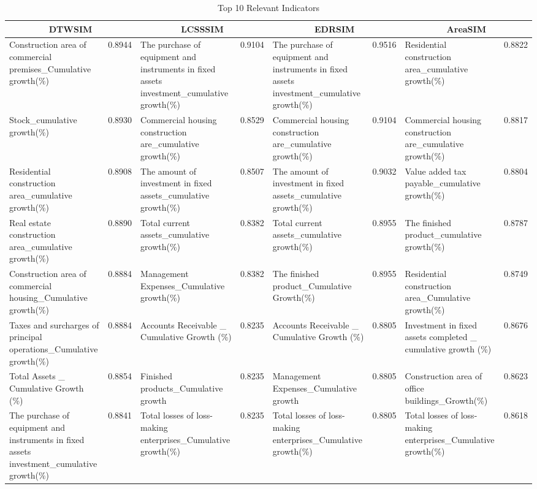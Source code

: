 \documentclass{sig-alternate-05-2015}
\begin{document}
\begin{table*}
\centering
\caption{Top 10 Relevant Indicators}
\label{tab:topindi}

\begin{tabular}{|p{3cm}|c|p{3cm}|c|p{3cm}|c|p{3cm}|c|} \hline
	\multicolumn{2}{|c|}{DTWSIM} & \multicolumn{2}{|c|}{LCSSSIM} &\multicolumn{2}{|c|}{EDRSIM} & \multicolumn{2}{|c|}{AreaSIM}\\ \hline
	Construction area of commercial premises\_Cumulative growth(\%) & 0.8944 & The purchase of equipment and instruments in fixed assets investment\_cumulative growth(\%) & 0.9104 & The purchase of equipment and instruments in fixed assets investment\_cumulative growth(\%)& 0.9516 & Residential construction area\_cumulative growth(\%)& 0.8822\\ \hline
	Stock\_cumulative growth(\%) & 0.8930 & Commercial housing construction are\_cumulative growth(\%) & 0.8529 & Commercial housing construction are\_cumulative growth(\%) & 0.9104 & Commercial housing construction are\_cumulative growth(\%) & 0.8817\\ \hline
	Residential construction area\_cumulative growth(\%) & 0.8908 & The amount of investment in fixed assets\_cumulative growth(\%)& 0.8507 & The amount of investment in fixed assets\_cumulative growth(\%) & 0.9032
 & Value added tax payable\_cumulative growth(\%) & 0.8804\\ \hline
	Real estate construction area\_cumulative growth(\%) & 0.8890 &Total current assets\_cumulative growth(\%) & 0.8382 & Total current assets\_cumulative growth(\%) & 0.8955 & The finished product\_cumulative growth(\%) & 0.8787\\ \hline
	Construction area of commercial housing\_Cumulative growth(\%) & 0.8884 & Management Expenses\_Cumulative growth(\%) & 0.8382
& The finished product\_Cumulative Growth(\%) & 0.8955 & Residential construction area\_Cumulative growth(\%) & 0.8749\\ \hline
	Taxes and surcharges of principal operations\_Cumulative growth(\%) & 0.8884 & Accounts Receivable \_ Cumulative Growth (\%) &0.8235 & Accounts Receivable \_ Cumulative Growth (\%) & 0.8805 & Investment in fixed assets completed \_ cumulative growth (\%) & 0.8676
\\ \hline
	Total Assets \_ Cumulative Growth (\%) & 0.8854 & Finished products\_Cumulative growth& 0.8235& Management Expenses\_Cumulative growth&0.8805 & Construction area of office buildings\_Growth(\%) &0.8623\\ \hline
	The purchase of equipment and instruments in fixed assets investment\_cumulative growth(\%) & 0.8841 &Total losses of loss-making enterprises\_Cumulative growth(\%) & 0.8235 &Total losses of loss-making enterprises\_Cumulative growth(\%)&0.8805 &Total losses of loss-making enterprises\_Cumulative growth(\%) &0.8618\\ \hline

\end{tabular}
\end{table*}
\end{document}
